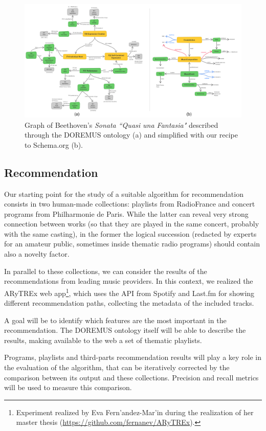 \documentclass{llncs}
\begin{document}
\begin{figure}
\includegraphics[width=12cm]{img/Beethoven-mapping.png}
\centering
\caption{Graph of Beethoven's \textit{Sonata ``Quasi una Fantasia"} described through the DOREMUS ontology (a) and simplified with our recipe to Schema.org  (b).}
\label{fig:beethoven-mapping}
\end{figure}


\subsection{Recommendation} Our starting point for the study of a suitable algorithm for recommendation consists in two human-made collections: playlists from RadioFrance and concert programs from Philharmonie de Paris. While the latter can reveal very strong connection between works (so that they are played in the same concert, probably with the same casting), in the former the logical succession (redacted by experts for an amateur public, sometimes inside thematic radio programs) should contain also a novelty factor.

In parallel to these collections, we can consider the results of the recommendations from leading music providers. In this context, we realized the ARyTREx web app\footnote{Experiment realized by Eva Fern\a'andez-Mar\a'in during the realization of her master thesis (\url{https://github.com/fernanev/ARyTREx}).}, which uses the API from Spotify and Last.fm for showing different recommendation paths, collecting the metadata of the included tracks. 

A goal will be to identify which features are the most important in the recommendation. The DOREMUS ontology itself will be able to describe the results, making available to the web a set of thematic playlists.

Programs, playlists and third-parts recommendation results will play a key role in the evaluation of the algorithm, that can be iteratively corrected by the comparison between its output and these collections. Precision and recall metrics will be used to measure this comparison.
\end{document}
